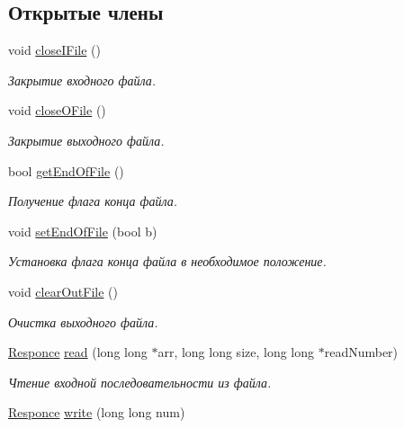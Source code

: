 \subsection*{Открытые члены}
\begin{DoxyCompactItemize}
\item 
void \hyperlink{class_file_manager_a4a4719a410ca31985e8b75ad75485ce6}{close\+I\+File} ()
\begin{DoxyCompactList}\small\item\em Закрытие входного файла. \end{DoxyCompactList}\item 
void \hyperlink{class_file_manager_a6a1f1ddbf047fc7e9531f483e4c62148}{close\+O\+File} ()
\begin{DoxyCompactList}\small\item\em Закрытие выходного файла. \end{DoxyCompactList}\item 
bool \hyperlink{class_file_manager_a49df99509ff2700e0e5edd06adca345c}{get\+End\+Of\+File} ()
\begin{DoxyCompactList}\small\item\em Получение флага конца файла. \end{DoxyCompactList}\item 
void \hyperlink{class_file_manager_ace8ce2677414831b5a9e7030248fc832}{set\+End\+Of\+File} (bool b)
\begin{DoxyCompactList}\small\item\em Установка флага конца файла в необходимое положение. \end{DoxyCompactList}\item 
void \hyperlink{class_file_manager_a2f1102abfd0a5a9d7e178968a3fdc56c}{clear\+Out\+File} ()
\begin{DoxyCompactList}\small\item\em Очистка выходного файла. \end{DoxyCompactList}\item 
\hyperlink{_structures_8h_a9864d6ef28dd6e38416afac4426b3491}{Responce} \hyperlink{class_file_manager_aba031d681752c80f52a8a8af9b69834e}{read} (long long $\ast$arr, long long size, long long $\ast$read\+Number)
\begin{DoxyCompactList}\small\item\em Чтение входной последовательности из файла. \end{DoxyCompactList}\item 
\hyperlink{_structures_8h_a9864d6ef28dd6e38416afac4426b3491}{Responce} \hyperlink{class_file_manager_a77cb9ec2885923dd6b7a9674cb75f85f}{write} (long long num)

\end{DoxyCompactItemize}
